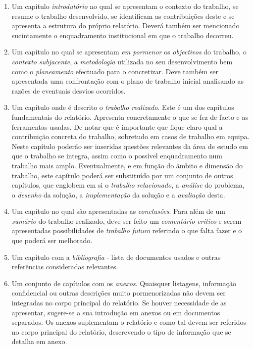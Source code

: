\begin{enumerate}
\item Um capítulo \emph{introdutório} no qual se apresentam o contexto do trabalho, se resume o trabalho desenvolvido, se identificam as contribuições deste e se apresenta a estrutura do próprio relatório. Deverá também ser mencionado sucintamente o enquadramento institucional em que o trabalho decorreu.
\item Um capítulo no qual se apresentam \emph{em pormenor} os \emph{objectivos} do trabalho, o \emph{contexto subjacente}, a \emph{metodologia} utilizada no seu desenvolvimento bem como o \emph{planeamento} efectuado para o concretizar. Deve também ser apresentada uma confrontação com o plano de trabalho inicial analisando as razões de eventuais desvios ocorridos.
\item Um capítulo onde é descrito o \emph{trabalho realizado}. Este é um dos capítulos fundamentais do relatório. Apresenta concretamente o que se fez de facto e as ferramentas usadas. De notar que é importante que fique claro qual a contribuição concreta do trabalho, sobretudo em casos de trabalho em equipa. Neste capítulo poderão ser inseridas questões relevantes da área de estudo em que o trabalho se integra, assim como o possível enquadramento num trabalho mais amplo. Eventualmente, e em função do âmbito e dimensão do trabalho, este capítulo poderá ser substituído por um conjunto de outros capítulos, que englobem em si o \emph{trabalho relacionado}, a \emph{análise} do problema, o \emph{desenho} da solução, a \emph{implementação} da solução e a \emph{avaliação} desta.
\item Um capítulo no qual são apresentadas as \emph{conclusões}. Para além de um \emph{sumário} do trabalho realizado, deve ser feito um \emph{comentário crítico} e serem apresentadas possibilidades de \emph{trabalho futuro} referindo o que falta fazer e o que poderá ser melhorado.
\item Um capítulo com a \emph{bibliografia} - lista de documentos usados e outras referências consideradas relevantes.
\item Um conjunto de capítulos com os \emph{anexos}. Quaisquer listagens, informação confidencial ou outras descrições muito pormenorizadas não devem ser integradas no corpo principal do relatório. Se houver necessidade de as apresentar, sugere-se a sua introdução em anexos ou em documentos separados. Os anexos suplementam o relatório e como tal devem ser referidos no corpo principal do relatório, descrevendo o tipo de informação que se detalha em anexo.
\end{enumerate}

